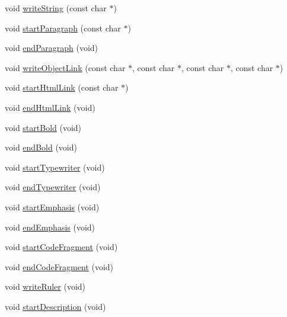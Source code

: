 \begin{DoxyCompactItemize}
\item 
void \mbox{\hyperlink{class_docbook_generator_a0435ece7899e4607115944383f2f1d77}{write\+String}} (const char $\ast$)
\item 
void \mbox{\hyperlink{class_docbook_generator_aa9920dace623a31301f5c7b9f5f739b8}{start\+Paragraph}} (const char $\ast$)
\item 
void \mbox{\hyperlink{class_docbook_generator_a6f793e8c29984f0ed8d654e9b89110e3}{end\+Paragraph}} (void)
\item 
void \mbox{\hyperlink{class_docbook_generator_a8cc7af4fed7938f5e5d81038eba432f0}{write\+Object\+Link}} (const char $\ast$, const char $\ast$, const char $\ast$, const char $\ast$)
\item 
void \mbox{\hyperlink{class_docbook_generator_adf4463cfec2c9d8ca083367f2e4afeff}{start\+Html\+Link}} (const char $\ast$)
\item 
void \mbox{\hyperlink{class_docbook_generator_a14123926fa57e6c0e8dbbbac55f368df}{end\+Html\+Link}} (void)
\item 
void \mbox{\hyperlink{class_docbook_generator_ad1704a02ae2ba6ab019e0c6e570ce218}{start\+Bold}} (void)
\item 
void \mbox{\hyperlink{class_docbook_generator_a798fe205e0beedacd6c035c865ae354c}{end\+Bold}} (void)
\item 
void \mbox{\hyperlink{class_docbook_generator_a220738e28a4e2939e4da767f0ad33886}{start\+Typewriter}} (void)
\item 
void \mbox{\hyperlink{class_docbook_generator_a2b987c6b42a8a5b5cea28f950fefa6cc}{end\+Typewriter}} (void)
\item 
void \mbox{\hyperlink{class_docbook_generator_ad3234d4df4f2e6db5e3e7d1c4c5b8382}{start\+Emphasis}} (void)
\item 
void \mbox{\hyperlink{class_docbook_generator_afa388cf9fb6c58601670f40fec5a2eb7}{end\+Emphasis}} (void)
\item 
void \mbox{\hyperlink{class_docbook_generator_a698cf0a67c7e73af0c76cb0cf54e1530}{start\+Code\+Fragment}} (void)
\item 
void \mbox{\hyperlink{class_docbook_generator_a5f6585ebe5d203c47bb25cefdd30d8fd}{end\+Code\+Fragment}} (void)
\item 
void \mbox{\hyperlink{class_docbook_generator_a69c4688a7f57b0cd7cc6eec70bf56e4d}{write\+Ruler}} (void)
\item 
void \mbox{\hyperlink{class_docbook_generator_abca64d577a05a2d49a99edfef8e72e72}{start\+Description}} (void)
\item 

\end{DoxyCompactItemize}
